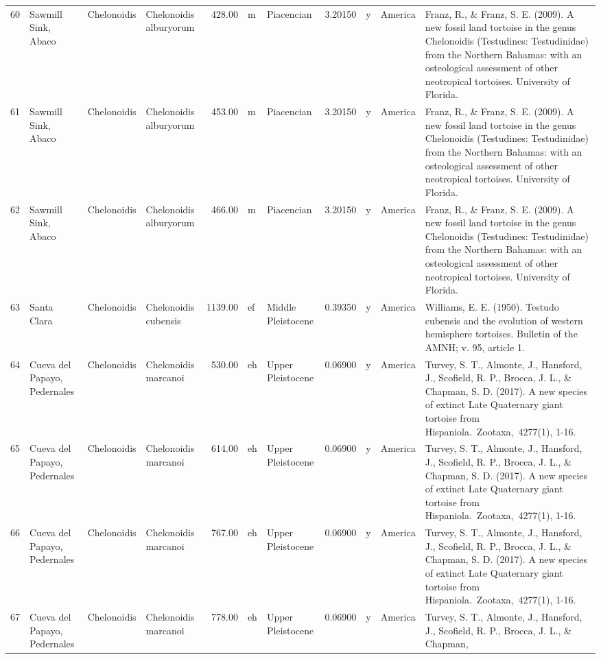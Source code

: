 \begin{landscape}
{\begin{longtable}[]{@{}llllrllrlll@{}}
	60 & Sawmill Sink, Abaco & Chelonoidis & Chelonoidis alburyorum & 428.00
	& m & Piacencian & 3.20150 & y & America & Franz, R., \& Franz, S. E.
	(2009). A new fossil land tortoise in the genus Chelonoidis (Testudines:
	Testudinidae) from the Northern Bahamas: with an osteological assessment
	of other neotropical tortoises. University of Florida.\tabularnewline
	61 & Sawmill Sink, Abaco & Chelonoidis & Chelonoidis alburyorum & 453.00
	& m & Piacencian & 3.20150 & y & America & Franz, R., \& Franz, S. E.
	(2009). A new fossil land tortoise in the genus Chelonoidis (Testudines:
	Testudinidae) from the Northern Bahamas: with an osteological assessment
	of other neotropical tortoises. University of Florida.\tabularnewline
	62 & Sawmill Sink, Abaco & Chelonoidis & Chelonoidis alburyorum & 466.00
	& m & Piacencian & 3.20150 & y & America & Franz, R., \& Franz, S. E.
	(2009). A new fossil land tortoise in the genus Chelonoidis (Testudines:
	Testudinidae) from the Northern Bahamas: with an osteological assessment
	of other neotropical tortoises. University of Florida.\tabularnewline
	63 & Santa Clara & Chelonoidis & Chelonoidis cubensis & 1139.00 & ef &
	Middle Pleistocene & 0.39350 & y & America & Williams, E. E. (1950).
	Testudo cubensis and the evolution of western hemisphere tortoises.
	Bulletin of the AMNH; v. 95, article 1.\tabularnewline
	64 & Cueva del Papayo, Pedernales & Chelonoidis & Chelonoidis marcanoi &
	530.00 & eh & Upper Pleistocene & 0.06900 & y & America & Turvey, S. T.,
	Almonte, J., Hansford, J., Scofield, R. P., Brocca, J. L., \& Chapman,
	S. D. (2017). A new species of extinct Late Quaternary giant tortoise
	from Hispaniola.~Zootaxa,~4277(1), 1-16.\tabularnewline
	65 & Cueva del Papayo, Pedernales & Chelonoidis & Chelonoidis marcanoi &
	614.00 & eh & Upper Pleistocene & 0.06900 & y & America & Turvey, S. T.,
	Almonte, J., Hansford, J., Scofield, R. P., Brocca, J. L., \& Chapman,
	S. D. (2017). A new species of extinct Late Quaternary giant tortoise
	from Hispaniola.~Zootaxa,~4277(1), 1-16.\tabularnewline
	66 & Cueva del Papayo, Pedernales & Chelonoidis & Chelonoidis marcanoi &
	767.00 & eh & Upper Pleistocene & 0.06900 & y & America & Turvey, S. T.,
	Almonte, J., Hansford, J., Scofield, R. P., Brocca, J. L., \& Chapman,
	S. D. (2017). A new species of extinct Late Quaternary giant tortoise
	from Hispaniola.~Zootaxa,~4277(1), 1-16.\tabularnewline
	67 & Cueva del Papayo, Pedernales & Chelonoidis & Chelonoidis marcanoi &
	778.00 & eh & Upper Pleistocene & 0.06900 & y & America & Turvey, S. T.,
	Almonte, J., Hansford, J., Scofield, R. P., Brocca, J. L., \& Chapman,

\end{longtable}}
\end{landscape}
